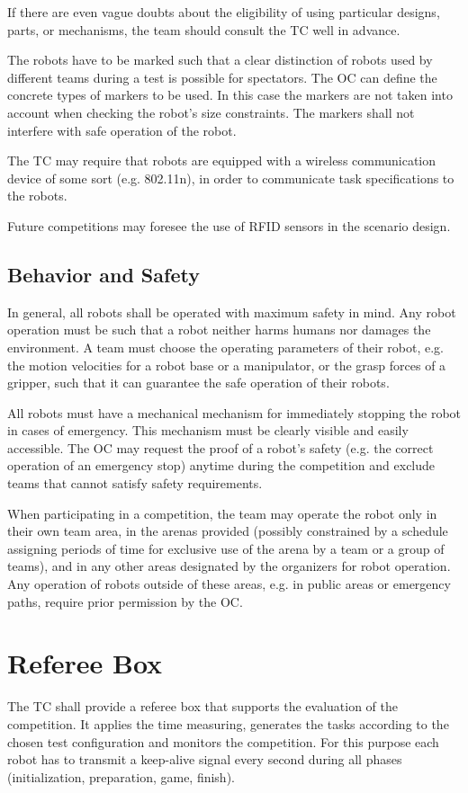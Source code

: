 \par
If there are even vague doubts about the eligibility of using particular designs, parts, or mechanisms, the team should consult the TC well in advance.
\par
The robots have to be marked such that a clear distinction of robots used by different teams during a test is possible for spectators. The OC can define the concrete types of markers to be used. In this case the markers are not taken into account when checking the robot's size constraints. The markers shall not interfere with safe operation of the robot.
\par
The TC may require that robots are equipped with a wireless communication device of some sort (e.g. 802.11n), in order to communicate task specifications to the robots.
\par
Future competitions may foresee the use of RFID sensors in the scenario design.

\subsection{Behavior and Safety} \label{ssec:RobotBehaviorAndSafety}
In general, all robots shall be operated with maximum safety in mind. Any robot operation must be such that a robot neither harms humans nor damages the environment. A team must choose the operating parameters of their robot, e.g. the motion velocities for a robot base or a manipulator, or the grasp forces of a gripper, such that it can guarantee the safe operation of their robots.
\par
All robots must have a mechanical mechanism for immediately stopping the robot in cases of emergency. This mechanism must be clearly visible and easily accessible. The OC may request the proof of a robot's safety (e.g. the correct operation of an emergency stop) anytime during the competition and exclude teams that cannot satisfy safety requirements.
\par
When participating in a competition, the team may operate the robot only in their own team area, in the arenas provided (possibly constrained by a schedule assigning periods of time for exclusive use of the arena by a team or a group of teams), and in any other areas designated by the organizers for robot operation. Any operation of robots outside of these areas, e.g. in public areas or emergency paths, require prior permission by the OC.

\section{Referee Box}
The TC shall provide a referee box that supports the evaluation of the competition. It applies the time measuring, generates the tasks according to the chosen test configuration and monitors the
competition. For this purpose each robot has to transmit a keep-alive signal every second during all phases (initialization, preparation, game, finish).

